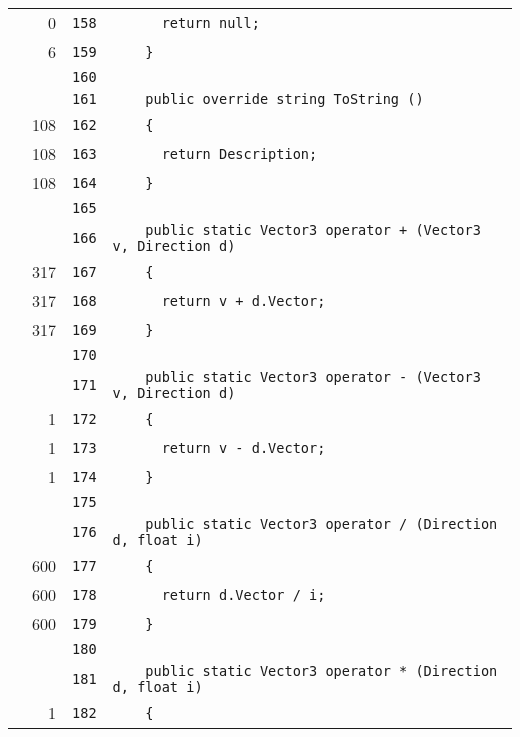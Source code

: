\documentclass[a4paper,10pt]{article}
\begin{document}
\begin{longtable}[l]{lrrl}
\cellcolor{red} & 0 & \verb~158~ & \verb~      return null;~\\
\cellcolor{green} & 6 & \verb~159~ & \verb~    }~\\
\cellcolor{gray} &  & \verb~160~ & \verb~~\\
\cellcolor{gray} &  & \verb~161~ & \verb~    public override string ToString ()~\\
\cellcolor{green} & 108 & \verb~162~ & \verb~    {~\\
\cellcolor{green} & 108 & \verb~163~ & \verb~      return Description;~\\
\cellcolor{green} & 108 & \verb~164~ & \verb~    }~\\
\cellcolor{gray} &  & \verb~165~ & \verb~~\\
\cellcolor{gray} &  & \verb~166~ & \verb~    public static Vector3 operator + (Vector3 v, Direction d)~\\
\cellcolor{green} & 317 & \verb~167~ & \verb~    {~\\
\cellcolor{green} & 317 & \verb~168~ & \verb~      return v + d.Vector;~\\
\cellcolor{green} & 317 & \verb~169~ & \verb~    }~\\
\cellcolor{gray} &  & \verb~170~ & \verb~~\\
\cellcolor{gray} &  & \verb~171~ & \verb~    public static Vector3 operator - (Vector3 v, Direction d)~\\
\cellcolor{green} & 1 & \verb~172~ & \verb~    {~\\
\cellcolor{green} & 1 & \verb~173~ & \verb~      return v - d.Vector;~\\
\cellcolor{green} & 1 & \verb~174~ & \verb~    }~\\
\cellcolor{gray} &  & \verb~175~ & \verb~~\\
\cellcolor{gray} &  & \verb~176~ & \verb~    public static Vector3 operator / (Direction d, float i)~\\
\cellcolor{green} & 600 & \verb~177~ & \verb~    {~\\
\cellcolor{green} & 600 & \verb~178~ & \verb~      return d.Vector / i;~\\
\cellcolor{green} & 600 & \verb~179~ & \verb~    }~\\
\cellcolor{gray} &  & \verb~180~ & \verb~~\\
\cellcolor{gray} &  & \verb~181~ & \verb~    public static Vector3 operator * (Direction d, float i)~\\
\cellcolor{green} & 1 & \verb~182~ & \verb~    {~\\

\end{longtable}
\end{document}
